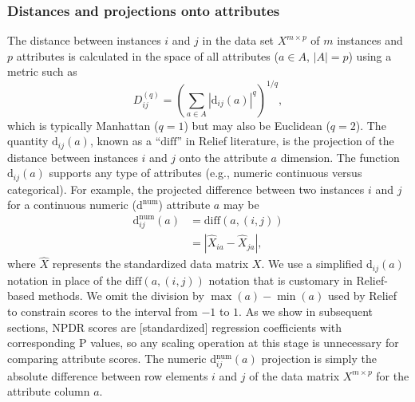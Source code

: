 \documentclass[10pt]{article}
\begin{document}
\subsubsection{Distances and projections onto attributes}
The distance between instances $i$ and $j$ in the data set $X^{m \times p}$ of $m$ instances and $p$ attributes is calculated in the space of all attributes ($a \in A$, $|A|=p$) using a metric such as
\begin{equation}\label{eq:D}
D^{(q)}_{ij}=\left(\sum_{a\in A}|\text{d}_{ij}(a)|^q\right)^{1/q},
\end{equation}
which is typically Manhattan ($q=1$) but may also be Euclidean ($q=2$). The quantity 
$\text{d}_{ij}(a)$,
known as a ``$\text{diff}$'' in Relief literature, is the projection of the distance between instances $i$ and $j$ onto the attribute $a$ dimension. The 
function $\text{d}_{ij}(a)$ supports any type of attributes
(e.g., numeric continuous versus categorical).
For example, the projected difference between two instances $i$ and $j$ for a continuous numeric ($\text{d}^{\text{num}}$) attribute $a$ may be
\begin{equation}\label{eq:diff}
\begin{aligned}
\text{d}^{\text{num}}_{ij}(a)&=\text{diff}(a,(i,j))\\
                                            & = {|\hat{X}_{ia}-\hat{X}_{ja}|},
\end{aligned}
\end{equation}
where $\hat{X}$ represents the standardized data matrix $X$.
We use a simplified d$_{ij}(a)$ notation in place of the $\text{diff}(a,(i,j))$ notation that is customary in Relief-based methods.
We omit the division by $\max(a)-\min(a)$ used by Relief to constrain scores to the interval from $-1$ to $1$.
As we show in subsequent sections, NPDR scores are [standardized] regression coefficients with corresponding P values, so any scaling operation at this stage is unnecessary for comparing attribute scores. 
The numeric d$^{\text{num}}_{ij}(a)$ projection is simply the absolute difference between row elements $i$ and $j$ of the data matrix $X^{m \times p}$ for the attribute column $a$. 
\end{document}
